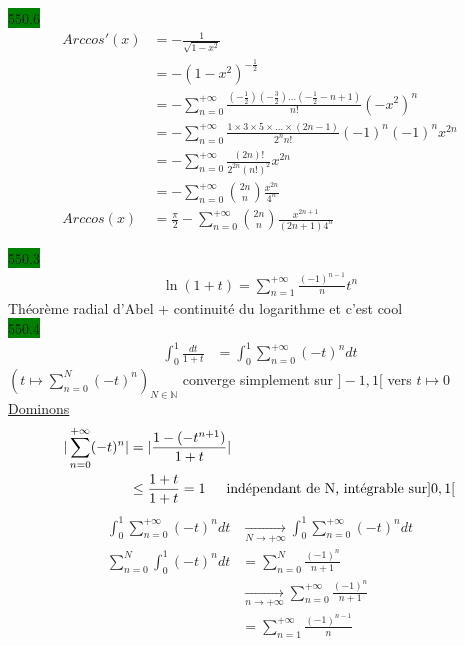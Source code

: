 \documentclass{article}
\begin{document}
  
\noindent \colorbox{green}{550.6}\\
\begin{align*}
  Arccos'(x) &= -\frac{1}{\sqrt{1-x^{2}}}\\ 
             &= -(1-x^{2})^{-\frac{1}{2}}\\ 
             &= - \sum_{n=0}^{+\infty}\frac{(-\frac{1}{2})(-\frac{3}{2})\dots(-\frac{1}{2}-n+1)}{n!}(-x^{2})^{n}\\ 
             &= - \sum_{n=0}^{+\infty}\frac{1\times 3 \times 5 \times \dots \times (2n-1)}{2^{n}n!}(-1)^{n}(-1)^{n}x^{2n}\\ 
             &= -\sum_{n=0}^{+\infty}\frac{(2n)!}{2^{2n}(n!)^{2}}x^{2n}\\ 
             &= -\sum_{n=0}^{+\infty}\binom{2n}{n}\frac{x^{2n}}{4^{n}}\\ 
  Arccos(x) &= \frac{\pi}{2} - \sum_{n=0}^{+\infty}\binom{2n}{n}\frac{x^{2n+1}}{(2n+1)4^{n}}
\end{align*}

\noindent \colorbox{green}{550.3}\\ 
\begin{align*}
    \ln(1+t) = \sum_{n=1}^{+\infty}\frac{(-1)^{n-1}}{n}t^{n}
\end{align*}
Théorème radial d'Abel + continuité du logarithme et c'est cool \\

\noindent \colorbox{green}{550.4}\\ 
\begin{align*}
  \int_{0}^{1}\frac{dt }{1+t} &= \int_{0}^{1}\sum_{n=0}^{+\infty}(-t)^{n} dt
\end{align*}
\((t \mapsto \sum_{n=0}^{N}(-t)^{n})_{N \in \mathbb{N}}\)
converge simplement sur \(]-1, 1[\) vers \(t \mapsto 0\)\\ 
\underline{Dominons}
\begin{align*}
  |\sum_{n=0}^{+\infty}(-t)^{n}| &= |\frac{1-(-t^{n+1})}{1+t}| \\
                                 &\leq \frac{1+t}{1+t} = 1 \indent \text{indépendant de N, intégrable sur} ]0, 1[
\end{align*}
\begin{align*}
  \int_{0}^{1}\sum_{n=0}^{+\infty}(-t)^{n}dt &\xrightarrow[N \to +\infty]{} \int_{0}^{1}\sum_{n=0}^{+\infty}(-t)^{n}dt \\ 
  \sum_{n=0}^{N}\int_{0}^{1}(-t)^{n}dt &= \sum_{n=0}^{N}\frac{(-1)^{n}}{n+1}\\ 
                                       &\xrightarrow[n \to +\infty]{} \sum_{n=0}^{+\infty}\frac{(-1)^{n}}{n+1}\\ 
                                       &= \sum_{n=1}^{+\infty}\frac{(-1)^{n-1}}{n}
\end{align*}
\end{document}
